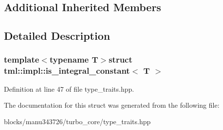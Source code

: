 \subsection*{Additional Inherited Members}


\subsection{Detailed Description}
\subsubsection*{template$<$typename T$>$struct tml\+::impl\+::is\+\_\+integral\+\_\+constant$<$ T $>$}



Definition at line 47 of file type\+\_\+traits.\+hpp.



The documentation for this struct was generated from the following file\+:\begin{DoxyCompactItemize}
\item 
blocks/manu343726/turbo\+\_\+core/type\+\_\+traits.\+hpp\end{DoxyCompactItemize}
